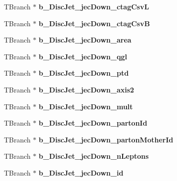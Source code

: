 \begin{DoxyCompactItemize}
T\+Branch $\ast$ {\bfseries b\+\_\+\+Disc\+Jet\+\_\+jec\+Down\+\_\+ctag\+CsvL}
\item 
\hypertarget{classMiniTree_a6395a4adcdc6e2c9de03123a72a8b9c9}{}\label{classMiniTree_a6395a4adcdc6e2c9de03123a72a8b9c9} 
T\+Branch $\ast$ {\bfseries b\+\_\+\+Disc\+Jet\+\_\+jec\+Down\+\_\+ctag\+CsvB}
\item 
\hypertarget{classMiniTree_aed24d0d5120aa7363d12e8efebc16dd8}{}\label{classMiniTree_aed24d0d5120aa7363d12e8efebc16dd8} 
T\+Branch $\ast$ {\bfseries b\+\_\+\+Disc\+Jet\+\_\+jec\+Down\+\_\+area}
\item 
\hypertarget{classMiniTree_aa6b513fed8bb6d18145cc4defbc99349}{}\label{classMiniTree_aa6b513fed8bb6d18145cc4defbc99349} 
T\+Branch $\ast$ {\bfseries b\+\_\+\+Disc\+Jet\+\_\+jec\+Down\+\_\+qgl}
\item 
\hypertarget{classMiniTree_a781ae59abae4f82e4a7f0806ad5d0484}{}\label{classMiniTree_a781ae59abae4f82e4a7f0806ad5d0484} 
T\+Branch $\ast$ {\bfseries b\+\_\+\+Disc\+Jet\+\_\+jec\+Down\+\_\+ptd}
\item 
\hypertarget{classMiniTree_a7d0df6d78bfcd9c847cd5c5378c65657}{}\label{classMiniTree_a7d0df6d78bfcd9c847cd5c5378c65657} 
T\+Branch $\ast$ {\bfseries b\+\_\+\+Disc\+Jet\+\_\+jec\+Down\+\_\+axis2}
\item 
\hypertarget{classMiniTree_adc3be0c890af26670897aadba386ed9e}{}\label{classMiniTree_adc3be0c890af26670897aadba386ed9e} 
T\+Branch $\ast$ {\bfseries b\+\_\+\+Disc\+Jet\+\_\+jec\+Down\+\_\+mult}
\item 
\hypertarget{classMiniTree_afa94195165f246a97c5e945d43f7fbb2}{}\label{classMiniTree_afa94195165f246a97c5e945d43f7fbb2} 
T\+Branch $\ast$ {\bfseries b\+\_\+\+Disc\+Jet\+\_\+jec\+Down\+\_\+parton\+Id}
\item 
\hypertarget{classMiniTree_ac5c97d4c4807c2e507919b2009ea4b22}{}\label{classMiniTree_ac5c97d4c4807c2e507919b2009ea4b22} 
T\+Branch $\ast$ {\bfseries b\+\_\+\+Disc\+Jet\+\_\+jec\+Down\+\_\+parton\+Mother\+Id}
\item 
\hypertarget{classMiniTree_aae333ed438288efeff2cca7be48243f5}{}\label{classMiniTree_aae333ed438288efeff2cca7be48243f5} 
T\+Branch $\ast$ {\bfseries b\+\_\+\+Disc\+Jet\+\_\+jec\+Down\+\_\+n\+Leptons}
\item 
\hypertarget{classMiniTree_a2c2a909589930b4c7d5addb494c4ff29}{}\label{classMiniTree_a2c2a909589930b4c7d5addb494c4ff29} 
T\+Branch $\ast$ {\bfseries b\+\_\+\+Disc\+Jet\+\_\+jec\+Down\+\_\+id}
\item 
\hypertarget{classMiniTree_ad424d5c9592890b7fda3a271e1eff34b}{}\label{classMiniTree_ad424d5c9592890b7fda3a271e1eff34b} 

\end{DoxyCompactItemize}
